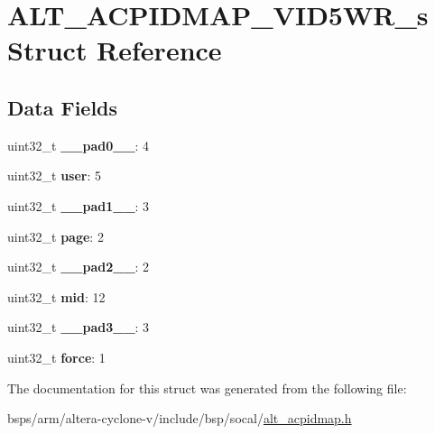 \hypertarget{structALT__ACPIDMAP__VID5WR__s}{}\section{A\+L\+T\+\_\+\+A\+C\+P\+I\+D\+M\+A\+P\+\_\+\+V\+I\+D5\+W\+R\+\_\+s Struct Reference}
\label{structALT__ACPIDMAP__VID5WR__s}
\subsection*{Data Fields}
\begin{DoxyCompactItemize}
\item 
\mbox{\label{structALT__ACPIDMAP__VID5WR__s_ad83954a98fda1b009d528aecb908a0bd}} 
uint32\+\_\+t {\bfseries \+\_\+\+\_\+pad0\+\_\+\+\_\+}\+: 4
\item 
\mbox{\label{structALT__ACPIDMAP__VID5WR__s_a317ef4cd83332d8208801080ab7100f0}} 
uint32\+\_\+t {\bfseries user}\+: 5
\item 
\mbox{\label{structALT__ACPIDMAP__VID5WR__s_a8ca4e4cf21e5287ae2567d97fa3a0996}} 
uint32\+\_\+t {\bfseries \+\_\+\+\_\+pad1\+\_\+\+\_\+}\+: 3
\item 
\mbox{\label{structALT__ACPIDMAP__VID5WR__s_aa6be32c3bbffe43ca112478dcc3e7d9d}} 
uint32\+\_\+t {\bfseries page}\+: 2
\item 
\mbox{\label{structALT__ACPIDMAP__VID5WR__s_a93a7c4df4521086bd9e001c966475e51}} 
uint32\+\_\+t {\bfseries \+\_\+\+\_\+pad2\+\_\+\+\_\+}\+: 2
\item 
\mbox{\label{structALT__ACPIDMAP__VID5WR__s_a4b806dbb32bccf0b17e29f67a70dac26}} 
uint32\+\_\+t {\bfseries mid}\+: 12
\item 
\mbox{\label{structALT__ACPIDMAP__VID5WR__s_a71d5324dcfe20d5b57b28c9b48dbd262}} 
uint32\+\_\+t {\bfseries \+\_\+\+\_\+pad3\+\_\+\+\_\+}\+: 3
\item 
\mbox{\label{structALT__ACPIDMAP__VID5WR__s_aa6071fc0f493cc723be767aa41f3f638}} 
uint32\+\_\+t {\bfseries force}\+: 1
\end{DoxyCompactItemize}


The documentation for this struct was generated from the following file\+:\begin{DoxyCompactItemize}
\item 
bsps/arm/altera-\/cyclone-\/v/include/bsp/socal/\mbox{\hyperlink{alt__acpidmap_8h}{alt\+\_\+acpidmap.\+h}}\end{DoxyCompactItemize}
